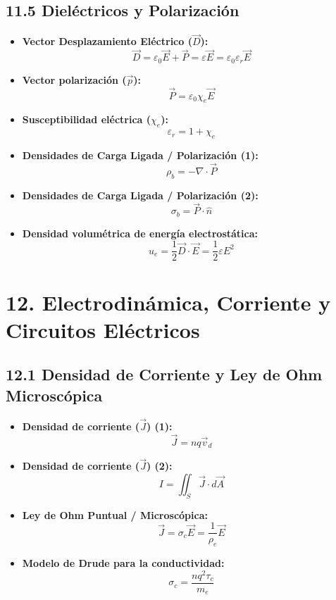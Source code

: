 \documentclass[11pt,a4paper]{article}
\begin{document}
\subsection*{11.5 Dieléctricos y Polarización}

\begin{itemize}
  \item \textbf{Vector Desplazamiento Eléctrico ($\vec{D}$):}
  \[
    \vec{D} = \varepsilon_0 \vec{E} + \vec{P} = \varepsilon \vec{E} = \varepsilon_0 \varepsilon_r \vec{E}
  \]
  \item \textbf{Vector polarización ($\vec{p}$):}
  \[
    \vec{P} = \varepsilon_0 \chi_e \vec{E}
  \]
  \item \textbf{Susceptibilidad eléctrica ($\chi_e$):}
  \[
    \varepsilon_r = 1 + \chi_e
  \]
  \item \textbf{Densidades de Carga Ligada / Polarización (1):}
  \[
    \rho_b = -\nabla \cdot \vec{P}
  \]
  \item \textbf{Densidades de Carga Ligada / Polarización (2):}
  \[
    \sigma_b = \vec{P} \cdot \hat{n}
  \]
  \item \textbf{Densidad volumétrica de energía electrostática:}
  \[
    u_e = \frac{1}{2} \vec{D} \cdot \vec{E} = \frac{1}{2} \varepsilon E^2
  \]
\end{itemize}

\section*{12. Electrodinámica, Corriente y Circuitos Eléctricos}

\subsection*{12.1 Densidad de Corriente y Ley de Ohm Microscópica}

\begin{itemize}
  \item \textbf{Densidad de corriente ($\vec{J}$) (1):}
  \[
    \vec{J} = n q \vec{v}_d
  \]
  \item \textbf{Densidad de corriente ($\vec{J}$) (2):}
  \[
    I = \iint_S \vec{J} \cdot d\vec{A}
  \]
  \item \textbf{Ley de Ohm Puntual / Microscópica:}
  \[
    \vec{J} = \sigma_c \vec{E} = \frac{1}{\rho_e} \vec{E}
  \]
  \item \textbf{Modelo de Drude para la conductividad:}
  \[
    \sigma_c = \frac{n q^2 \tau_c}{m_e}
  \]
\end{itemize}
\end{document}
